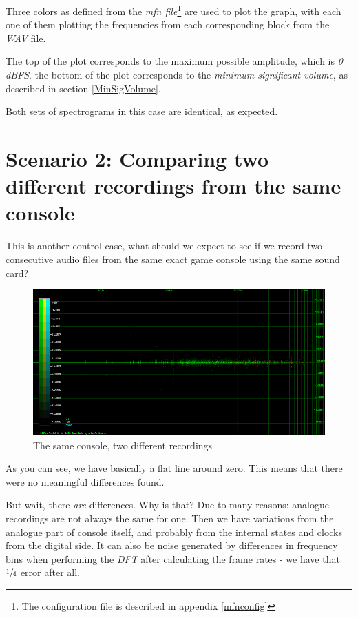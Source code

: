 \documentclass[10pt,a4paper]{report}
\begin{document}
Three colors as defined from the \textit{mfn file}\footnote{The configuration file is described in appendix \ref{mfnconfig}} are used to plot the graph, with each one of them plotting the frequencies from each corresponding block from the \textit{WAV} file.

The top of the plot corresponds to the maximum possible amplitude, which is \textit{0 dBFS}. the bottom of the plot corresponds to the \textit{minimum significant volume}, as described in section \ref{MinSigVolume}.

Both sets of spectrograms in this case are identical, as expected. 

\section{Scenario 2: Comparing two different recordings from the same console}

This is another control case, what should we expect to see if we record two consecutive audio files from the same exact game console using the same sound card?

\begin{figure}[H]
	\centering
	\includegraphics[width=1\linewidth]{plots/Plot2-Sameconsole.png}
	\caption[Same console compared]{The same console, two different recordings}
	\label{fig:plot2-sameconsole}
\end{figure}

As you can see, we have basically a flat line around zero. This means that there were no meaningful differences found. 

But wait, there \textit{are} differences. Why is that? Due to many reasons: analogue recordings are not always the same for one. Then we have variations from the analogue part of console itself, and probably from the internal states and clocks from the digital side. It can also be noise generated by differences in frequency bins when performing the \textit{DFT} after calculating the frame rates - we have that $\sfrac{1}{4}$ error after all.
\end{document}
